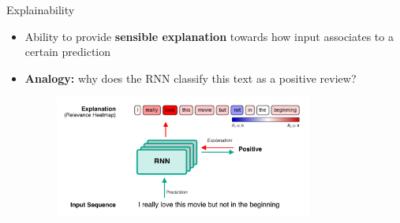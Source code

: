 \documentclass[Nike]{tuberlinbeamer}
\begin{document}
\begin{frame}{Explainability}
\begin{itemize}
	\item Ability to provide \textbf{sensible explanation} towards how input associates to a certain prediction
	\item \textbf{Analogy:} why does the RNN classify this text as a positive review?

	\begin{figure}[h]
		\includegraphics [width=0.8\textwidth]{figures/present_explanation_rnn}
	\end{figure}
	
%
\end{itemize}
	
\end{frame}
\end{document}
